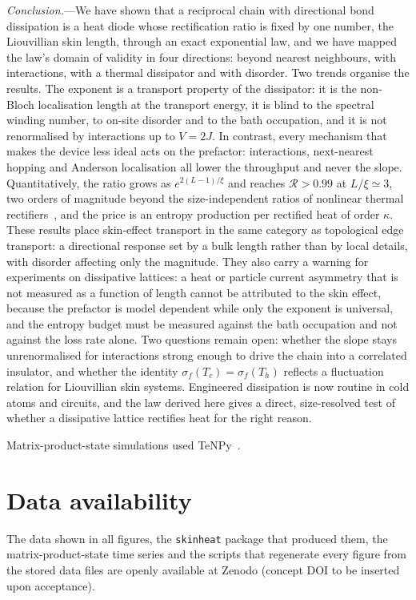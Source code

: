 \documentclass[reprint,aps,prl,superscriptaddress,nofootinbib,floatfix]{revtex4-2}
\newcommand{\R}{\mathcal{R}}
\begin{document}
\textit{Conclusion.}---We have shown that a reciprocal chain with directional bond dissipation is a heat diode whose rectification ratio is fixed by one number, the Liouvillian skin length, through an exact exponential law, and we have mapped the law's domain of validity in four directions: beyond nearest neighbours, with interactions, with a thermal dissipator and with disorder.
Two trends organise the results. The exponent is a transport property of the dissipator: it is the non-Bloch localisation length at the transport energy, it is blind to the spectral winding number, to on-site disorder and to the bath occupation, and it is not renormalised by interactions up to $V=2J$. In contrast, every mechanism that makes the device less ideal acts on the prefactor: interactions, next-nearest hopping and Anderson localisation all lower the throughput and never the slope. Quantitatively, the ratio grows as $e^{2(L-1)/\xi}$ and reaches $\R>0.99$ at $L/\xi\simeq3$, two orders of magnitude beyond the size-independent ratios of nonlinear thermal rectifiers~\cite{Li2012}, and the price is an entropy production per rectified heat of order $\kappa$.
These results place skin-effect transport in the same category as topological edge transport: a directional response set by a bulk length rather than by local details, with disorder affecting only the magnitude. They also carry a warning for experiments on dissipative lattices: a heat or particle current asymmetry that is not measured as a function of length cannot be attributed to the skin effect, because the prefactor is model dependent while only the exponent is universal, and the entropy budget must be measured against the bath occupation and not against the loss rate alone. Two questions remain open: whether the slope stays unrenormalised for interactions strong enough to drive the chain into a correlated insulator, and whether the identity $\sigma_f(T_c)=\sigma_f(T_h)$ reflects a fluctuation relation for Liouvillian skin systems. Engineered dissipation is now routine in cold atoms and circuits, and the law derived here gives a direct, size-resolved test of whether a dissipative lattice rectifies heat for the right reason.

\begin{acknowledgments}
Matrix-product-state simulations used TeNPy~\cite{Hauschild2018}.
\end{acknowledgments}

\section*{Data availability}
The data shown in all figures, the \texttt{skinheat} package that produced them, the matrix-product-state time series and the scripts that regenerate every figure from the stored data files are openly available at Zenodo (concept DOI to be inserted upon acceptance).



\end{document}
